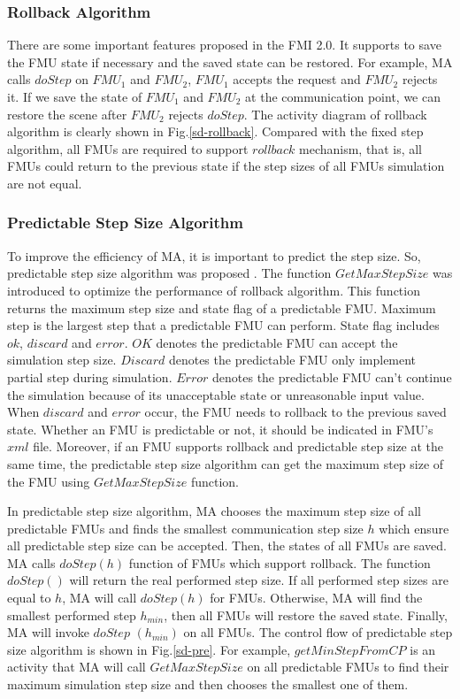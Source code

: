\subsubsection{Rollback Algorithm}
There are some important features proposed in the FMI 2.0. It supports to save the FMU state if necessary and the saved state can be restored. For example, MA calls $doStep$ on $FMU_{1}$ and $FMU_{2}$, $FMU_{1}$ accepts the request and $FMU_{2}$ rejects it. If we save the state of $FMU_{1}$ and $FMU_{2}$ at the communication point, we can restore the scene after $FMU_{2}$ rejects $doStep$. The activity diagram of rollback algorithm \cite{BromanBGLMTW13} is clearly shown in Fig.\ref{sd-rollback}. Compared with the fixed step algorithm, all FMUs are required to support $rollback$ mechanism, that is, all FMUs could return to the previous state if the step sizes of all FMUs simulation are not equal.
\subsubsection{Predictable Step Size Algorithm}
To improve the efficiency of MA, it is important to predict the step size. So, predictable step size algorithm was proposed \cite{BromanBGLMTW13}. The function $GetMaxStepSize$ was introduced to optimize the performance of rollback algorithm. This function returns the maximum step size and state flag of a predictable FMU. Maximum step is the largest step that a predictable FMU can perform. State flag includes $ok$, $discard$ and $error$. $OK$ denotes the predictable FMU can accept the simulation step size. $Discard$ denotes the predictable FMU only implement partial step during simulation. $Error$ denotes the predictable FMU can't continue the simulation because of its unacceptable state or unreasonable input value. When $discard$ and $error$ occur, the FMU needs to rollback to the previous saved state. Whether an FMU is predictable or not, it should be indicated in FMU's $xml$ file. Moreover, if an FMU supports rollback and predictable step size at the same time, the predictable step size algorithm can get the maximum step size of the FMU using $GetMaxStepSize$ function.

In predictable step size algorithm, MA chooses the maximum step size of all predictable FMUs and finds the smallest communication step size $h$ which ensure all predictable step size can be accepted. Then, the states of all FMUs are saved. MA calls $doStep(h)$ function of FMUs which support rollback. The function $doStep()$ will return the real performed step size. If all performed step sizes are equal to $h$, MA will call $doStep(h)$ for FMUs. Otherwise, MA will find the smallest performed step $h_{min}$, then all FMUs will restore the saved state. Finally, MA will invoke $doStep$ $(h_{min})$ on all FMUs. The control flow of predictable step size algorithm is shown in Fig.\ref{sd-pre}. For example, $getMinStepFromCP$ is an activity that MA will call $GetMaxStepSize$ on all predictable FMUs to find their maximum simulation step size and then chooses the smallest one of them. 

